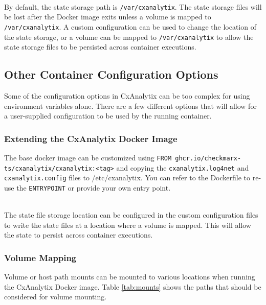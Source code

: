 \noindent\\By default, the state storage path is \verb|/var/cxanalytix|. The state storage files will be lost after the Docker image exits unless a volume is mapped 
to \verb|/var/cxanalytix|. A custom configuration can be used to change the location of the state storage, or a volume can be mapped to 
\verb|/var/cxanalytix| to allow the state storage files to be persisted across container executions.


\subsection{Other Container Configuration Options}

Some of the configuration options in CxAnalytix can be too complex for using environment variables alone.  There are a few different options
that will allow for a user-supplied configuration to be used by the running container.

\subsubsection{Extending the CxAnalytix Docker Image}

The base docker image can be customized using \verb|FROM ghcr.io/checkmarx-ts/cxanalytix/cxanalytix:<tag>| and copying 
the \verb|cxanalytix.log4net| and \verb|cxanalytix.config| files to /etc/cxanalytix. You can refer to the Dockerfile to re-use the \verb|ENTRYPOINT| or 
provide your own entry point.

\noindent\\The state file storage location can be configured in the custom configuration files to write the state files at a location where a 
volume is mapped.  This will allow the state to persist across container executions.


\subsubsection{Volume Mapping}

Volume or host path mounts can be mounted to various locations when running the CxAnalytix Docker image.  Table \ref{tab:mounts} shows
the paths that should be considered for volume mounting.

